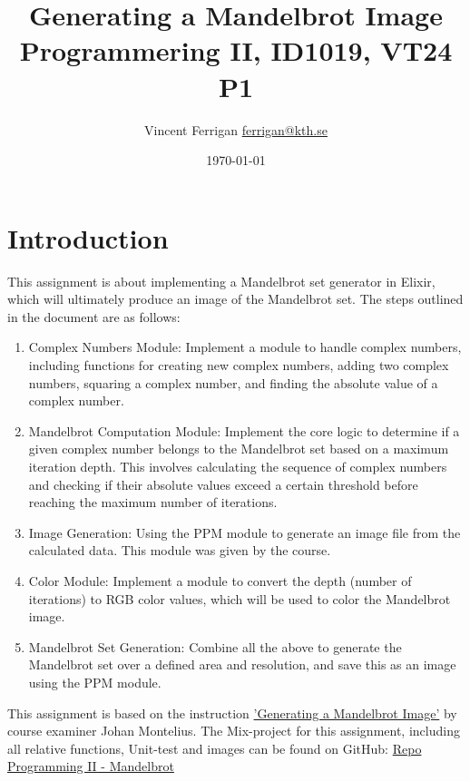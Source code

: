 \documentclass[a4paper,11pt]{article}
\begin{document}
\title{
    Generating a Mandelbrot Image
\\\small{Programmering II, ID1019, VT24 P1}
}
\author{Vincent Ferrigan \href{mailto:ferrigan@kth.se}{ferrigan@kth.se}}

\date{\today}
\maketitle

\section*{Introduction}
\label{sec:introduction}
This assignment is about implementing a Mandelbrot set generator in
Elixir, which will ultimately produce an image of the Mandelbrot set. 
The steps outlined in the document are as follows:
\begin{enumerate}
    \item Complex Numbers Module: Implement a module to handle complex numbers,
    including functions for creating new complex numbers, adding two complex
    numbers, squaring a complex number, and finding the absolute value of a
    complex number.
    \item Mandelbrot Computation Module: Implement the core logic to determine
    if a given complex number belongs to the Mandelbrot set based on a maximum
    iteration depth.
    This involves calculating the sequence of complex numbers
    and checking if their absolute values exceed a certain threshold before
    reaching the maximum number of iterations.
    \item Image Generation: Using the PPM module to generate an image file from
    the calculated data.
    This module was given by the course.
    \item Color Module: Implement a module to convert the depth (number of
    iterations) to RGB color values, which will be used to color the Mandelbrot
    image.
    \item Mandelbrot Set Generation: Combine all the above to generate the
    Mandelbrot set over a defined area and resolution, and save this as an image
    using the PPM module.
\end{enumerate}
This assignment is based on the instruction
\href{https://people.kth.se/~johanmon/courses/id1019/seminars/mandel/mandel.pdf}{'Generating a Mandelbrot Image'}
by course examiner Johan Montelius.
The Mix-project for this assignment, including all relative functions, Unit-test and images can be found on GitHub:
\href{https://github.com/VincentFerrigan/kth-id1019-programming-ii/tree/main/tasks/7/mandelbrot}{Repo Programming II - Mandelbrot}%
\end{document}
